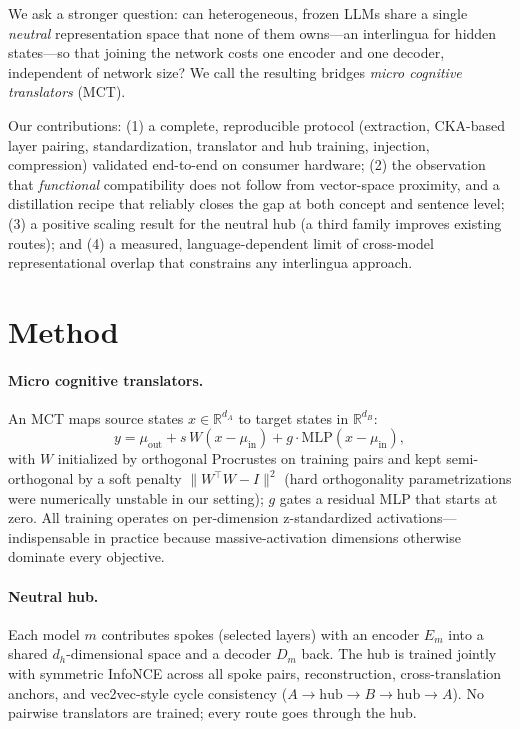 \documentclass[11pt]{article}
\begin{document}
We ask a stronger question: can heterogeneous, frozen LLMs share a single
\emph{neutral} representation space that none of them owns---an interlingua
for hidden states---so that joining the network costs one encoder and one
decoder, independent of network size? We call the resulting bridges
\emph{micro cognitive translators} (MCT).

Our contributions: (1) a complete, reproducible protocol (extraction,
CKA-based layer pairing, standardization, translator and hub training,
injection, compression) validated end-to-end on consumer hardware;
(2) the observation that \emph{functional} compatibility does not follow from
vector-space proximity, and a distillation recipe that reliably closes the
gap at both concept and sentence level; (3) a positive scaling result for the
neutral hub (a third family improves existing routes); and (4) a measured,
language-dependent limit of cross-model representational overlap that
constrains any interlingua approach.

\section{Method}
\paragraph{Micro cognitive translators.} An MCT maps source states
$x \in \mathbb{R}^{d_A}$ to target states in $\mathbb{R}^{d_B}$:
\[
y = \mu_{\text{out}} + s\,W(x-\mu_{\text{in}}) + g\cdot\mathrm{MLP}(x-\mu_{\text{in}}),
\]
with $W$ initialized by orthogonal Procrustes on training pairs and kept
semi-orthogonal by a soft penalty $\lVert W^\top W - I\rVert^2$ (hard
orthogonality parametrizations were numerically unstable in our setting);
$g$ gates a residual MLP that starts at zero. All training operates on
per-dimension z-standardized activations---indispensable in practice because
massive-activation dimensions otherwise dominate every objective.

\paragraph{Neutral hub.} Each model $m$ contributes spokes (selected layers)
with an encoder $E_{m}$ into a shared $d_h$-dimensional space and a decoder
$D_{m}$ back. The hub is trained jointly with symmetric InfoNCE across all
spoke pairs, reconstruction, cross-translation anchors, and vec2vec-style
cycle consistency ($A\!\to\!\text{hub}\!\to\!B\!\to\!\text{hub}\!\to\!A$).
No pairwise translators are trained; every route goes through the hub.
\end{document}
